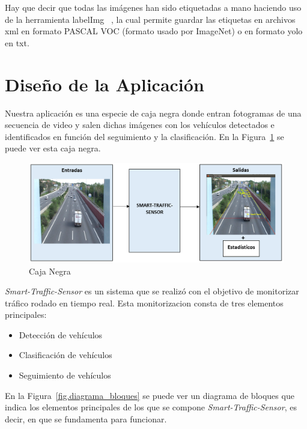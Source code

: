Hay que decir que todas las imágenes han sido etiquetadas a mano haciendo uso de la herramienta labelImg ~\cite{labelimg}, la cual permite guardar las etiquetas en archivos xml en formato PASCAL VOC (formato usado por ImageNet) o en formato \acrshort{yolo} en txt.

\section{Diseño de la Aplicación}

Nuestra aplicación es una especie de caja negra donde entran fotogramas de una secuencia de video y salen dichas imágenes con los vehículos detectados e identificados en función del seguimiento y la clasificación. En la Figura~\ref{fig.caja_negra} se puede ver esta caja negra.

\begin{figure}[H] 
\begin{center}
	\includegraphics[width=1\textwidth]{figures/Diseno_global/caja_negra.PNG}
   \caption{Caja Negra}
	\label{fig.caja_negra}
\end{center}
\end{figure}

\textit{Smart-Traffic-Sensor} es un sistema que se realizó con el objetivo de monitorizar tráfico rodado en tiempo real. Esta monitorizacion consta de tres elementos principales:

\begin{itemize}
    \item Detección de vehículos
    \item Clasificación de vehículos
    \item Seguimiento de vehículos
\end{itemize}

En la Figura~\ref{fig.diagrama_bloques} se puede ver un diagrama de bloques que indica los elementos principales de los que se compone \textit{Smart-Traffic-Sensor}, es decir, en que se fundamenta para funcionar.

